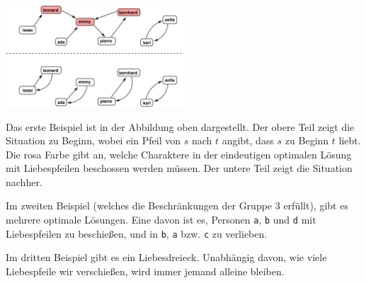 \section*{\sampleexplanations}

\begin{center}
\includegraphics[width=0.5\textwidth]{polygonfig.pdf}
\end{center}

Das erste Beispiel ist in der Abbildung oben dargestellt.
Der obere Teil zeigt die Situation zu Beginn, wobei ein Pfeil von $s$ nach $t$ angibt, dass $s$ zu Beginn $t$ liebt. Die rosa Farbe gibt an, welche Charaktere in der eindeutigen optimalen Lösung mit Liebespfeilen beschossen werden müssen.
Der untere Teil zeigt die Situation nachher.

Im zweiten Beispiel (welches die Beschränkungen der Gruppe 3 erfüllt), gibt es mehrere optimale Lösungen.
Eine davon ist es, Personen \texttt{a}, \texttt{b} und \texttt{d} mit Liebespfeilen zu beschießen, und in \texttt{b}, \texttt{a} bzw. \texttt{c} zu verlieben.

Im dritten Beispiel gibt es ein Liebesdreieck. Unabhängig davon, wie viele Liebespfeile wir verschießen, wird immer jemand alleine bleiben.
